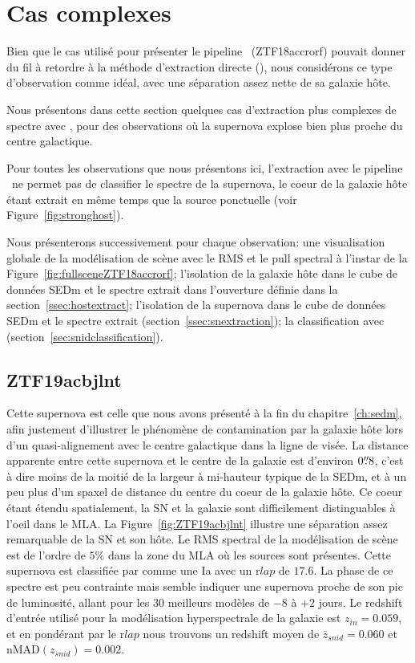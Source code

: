 \documentclass[../main/main.tex]{subfiles}
\begin{document}
\section{Cas complexes}

Bien que le cas utilisé pour présenter le pipeline \hypergal\
(ZTF18accrorf) pouvait donner du
fil à retordre à la méthode d'extraction directe (\pysedm), nous
considérons ce type d'observation comme idéal, avec une séparation assez
nette de sa galaxie hôte.

Nous présentons dans cette section quelques cas d'extraction plus
complexes de spectre avec \hypergal, pour des observations où la supernova explose
bien plus proche du centre galactique.

Pour toutes les observations que nous présentons ici, l'extraction avec le pipeline
\pysedm\ ne permet pas de classifier le spectre de la supernova, le coeur de
la galaxie hôte étant extrait en même temps que la source ponctuelle
(voir Figure~\ref{fig:stronghost}).

Nous présenterons successivement pour chaque observation: une visualisation globale de la
modélisation de scène avec le RMS et le pull spectral
à l'instar de la Figure~\ref{fig:fullsceneZTF18accrorf}; l'isolation de
la galaxie hôte dans le cube de données SEDm
et le spectre extrait dans l'ouverture définie dans la section~\ref{ssec:hostextract};
l'isolation de la supernova dans le cube de données SEDm et le spectre
extrait (section~\ref{ssec:snextraction}); la
classification avec  (section~\ref{sec:snidclassification}). 

\subsection{ZTF19acbjlnt}

Cette supernova est celle que nous avons présenté à la fin du
chapitre~\ref{ch:sedm}, afin justement d'illustrer le phénomène de
contamination par la galaxie hôte lors d'un quasi-alignement avec le centre
galactique dans la ligne de visée. La distance apparente entre cette
supernova et le centre de la galaxie est d'environ $0\overset{\prime\prime}{.}8$, c'est à dire moins de la moitié
de la largeur à mi-hauteur typique de la SEDm, et à un peu plus d'un spaxel
de distance du centre du coeur de la galaxie hôte. Ce coeur étant étendu
spatialement, la SN et la galaxie sont difficilement distinguables à
l'oeil dans le MLA. La Figure~\ref{fig:ZTF19acbjlnt} illustre une
séparation assez remarquable de la SN et son hôte. Le RMS spectral de la
modélisation de scène est de l'ordre de $5\%$ dans la zone du MLA où les
sources sont présentes. Cette supernova est classifiée par \pkg{SNID}
comme une Ia avec un r$lap$ de $17.6$. La phase de ce spectre est peu contrainte mais semble
indiquer une supernova proche de son pic de luminosité, allant pour
les $30$ meilleurs modèles de $-8$ à $+2$ jours.
Le redshift d'entrée utilisé pour la modélisation hyperspectrale de la
galaxie est $z_{in}=0.059$, et en pondérant par le r$lap$ nous trouvons
un redshift moyen de $\bar{z}_{snid}=0.060$ et nMAD$(z_{snid})=0.002$.
\end{document}
